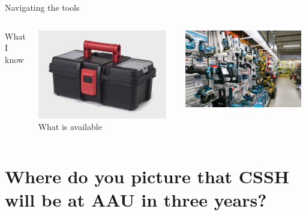 \documentclass[10pt]{beamer}
\begin{document}
\begin{frame}[fragile]{Navigating the tools}  
\begin{columns}[T,onlytextwidth]
        \centering
        What I know
        
        \includegraphics[width=0.95\textwidth]{toolbox}
        \centering
        What is available
        
        \includegraphics[width=0.95\textwidth]{byggemarked}

\end{columns}


\end{frame}

\section{Where do you picture that CSSH will be at AAU in three years?}
\end{document}
